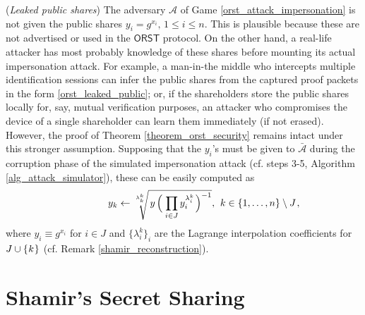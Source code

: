 \documentclass{iacrtrans}
\begin{document}
\begin{rem}\label{rem_leaked_public_shares}
(\textit{Leaked public shares})
The adversary $\mathcal{A}$ of Game \ref{orst_attack_impersonation}
is not given the public shares
$y_i = g ^ {x_i},\hspace{2pt} 1 \le i \le n$.
This is plausible because these are not advertised or used
in the $\mathsf{ORST}$ protocol.
On the other hand, a real-life attacker has most probably
knowledge of these shares before mounting
its actual impersonation attack.
For example, a man-in-the middle who intercepts multiple
identification sessions can infer the public shares
from the captured proof packets in the form
\eqref{orst_leaked_public};
or, if the shareholders store the public shares
locally for, say, mutual verification purposes,
an attacker who compromises the device of a single shareholder
can learn them immediately (if not erased).
However, the proof of Theorem \ref{theorem_orst_security}
remains intact under this stronger assumption.
Supposing that the $y_i$'s must be given to $\mathcal{\bar{A}}$
during the corruption phase of the simulated impersonation attack
(cf. steps 3-5, Algorithm \ref{alg_attack_simulator}),
these can be easily computed as
\vspace{5pt}
\begin{equation*}
\hspace{42pt}
y_k \leftarrow
\sqrt[\leftroot{0}\uproot{10}\lambda_k^k]{\hspace{1.5pt}y\hspace{1.5pt}
\Big(\hspace{1pt}\prod_{i \in J} y_i^{\lambda_i^k}\hspace{1pt}\Big)^{-1}},
\hspace{4pt} k \in \{1, \dots, n\} \setminus J\hspace{1pt},
\vspace{5pt}
\end{equation*}
where $y_i \equiv g ^ {x_i}$ for $i \in J$
and $\{\lambda_i^k\}_i$
are the Lagrange interpolation coefficients for
$J \cup \{\hspace{0.5pt}k\hspace{0.5pt}\}$
(cf. Remark \ref{shamir_reconstruction}).
\end{rem}

\appendix

\section{Shamir's Secret Sharing}\label{section_shamir}
\end{document}
